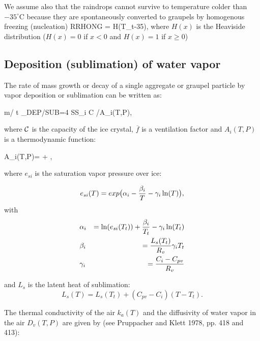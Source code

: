 We assume also that the raindrops cannot survive to temperature colder than
$-35^\circ$C because they are spontaneously converted to graupels by homogenous
freezing (nucleation)
%
\be\label{HOM5}
RRHONG =  H(T_t-35),
\ee
\noindent where $H(x)$ is the Heaviside distribution ($H(x)=0$ if $x<0$ and
$H(x)=1$ if $x \ge 0$)


%
\subsection{Deposition (sublimation) of water vapor}
%

The rate of mass growth or decay of a single aggregate or graupel particle by
vapor deposition or sublimation can be written as:

%
\be\label{DEP1}
\partial m/ \partial t \mid_{DEP/SUB}=4 \pi SS_i {\cal C}  /A_{i}(T,P),
\ee
%

\noindent where $\cal C$ is the capacity of the ice crystal, $\overline{f}$ is a
ventilation factor and $A_{i}(T,P)$ is a thermodynamic function:

%
\be\label{DEP2}
A_{i}(T,P)=  +
        ,
\ee
%

\noindent where $e_{si}$ is the saturation vapor pressure over ice:

\begin{equation}
e_{si}(T)= exp \big( \alpha_i - {\beta_i \over T} - \gamma_i \ln (T) \big),
\end{equation}
with
\begin{eqnarray}
&\alpha_i   &= \ln (e_{si}(T_t))+{\beta_i \over T_t} - \gamma_i \ln (T_t) \\
&\beta_i   &= {L_s(T_t) \over R_v}\gamma_i T_t \\
&\gamma_i  &= {C_i -C_{pv} \over R_v}
\end{eqnarray}

\noindent and $L_s$ is the latent heat of sublimation:
\begin{equation}
L_s(T) = L_s(T_t) + (C_{pv} - C_i)(T-T_t).
\end{equation}

\noindent The thermal conductivity of the air $k_{a}(T)$ and the diffusivity of
water vapor in the air $D_{v}(T,P)$ are given by (see Pruppacher and Klett 1978, pp. 418 and 413):

